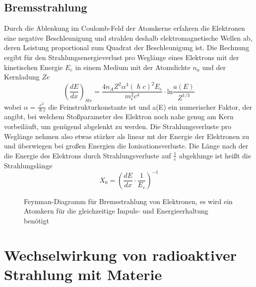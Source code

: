 \documentclass[Ex4_Zusammenfassung.tex]{subfiles}
\begin{document}
\subsection*{Bremsstrahlung}
Durch die Ablenkung im Coulomb-Feld der Atomkerne erfahren die Elektronen eine negative Beschleunigung und strahlen deshalb elektromagnetische Wellen ab, deren Leistung proportional zum Quadrat der Beschleunigung ist. Die Rechnung ergibt für den Strahlungsenergieverlust pro Weglänge eines Elektrons mit der kinetischen Energie $E_e$ in einem Medium mit der Atomdichte $n_a$ und der Kernladung $Ze$
\begin{equation}
\left( \frac{dE}{dx} \right)_{Str} = \frac{4 n_A Z^2 \alpha^3 (\hslash c)^2 E_e}{m_e^2 c^4} \cdot \text{ln} \frac{a(E)}{Z^{1/3}} 
\end{equation}
wobei $\alpha = \frac{e^2}{\hslash c} $ die Feinstrukturkonstante ist und a(E) ein numerischer Faktor, der angibt, bei welchem Stoßparameter des Elektron noch nahe genug am Kern vorbeiläuft, um genügend abgelenkt zu werden. Die Strahlungsverluste pro Weglänge nehmen also etwas stärker als linear mt der Energie der Elektronen zu und überwiegen bei großen Energien die Ionisationsverluste. \newline
Die Länge nach der die Energie des Elektrons durch Strahlungsverluste auf $\frac{1}{e} $ abgeklunge ist heißt die Strahlungslänge 
\begin{equation}
X_0 = \left( \frac{dE}{dx} \cdot \frac{1}{E_e} \right)^{-1}
\end{equation}

	\begin{figure}[H]
	\centering
		\caption{Feynman-Diagramm für Bremsstrahlung von Elektronen, es wird ein Atomkern für die gleichzeitige Impuls- und Energieerhaltung benötigt}
	\end{figure}
\newpage
\section{Wechselwirkung von radioaktiver Strahlung mit Materie}
\end{document}
